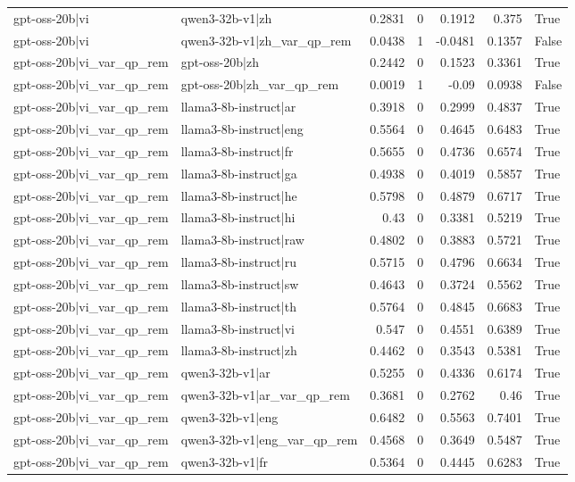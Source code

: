 \begin{table}
\begin{tabular}{l l r r r r l}
gpt-oss-20b|vi & qwen3-32b-v1|zh & 0.2831 & 0 & 0.1912 & 0.375 & True \\
gpt-oss-20b|vi & qwen3-32b-v1|zh_var_qp_rem & 0.0438 & 1 & -0.0481 & 0.1357 & False \\
gpt-oss-20b|vi_var_qp_rem & gpt-oss-20b|zh & 0.2442 & 0 & 0.1523 & 0.3361 & True \\
gpt-oss-20b|vi_var_qp_rem & gpt-oss-20b|zh_var_qp_rem & 0.0019 & 1 & -0.09 & 0.0938 & False \\
gpt-oss-20b|vi_var_qp_rem & llama3-8b-instruct|ar & 0.3918 & 0 & 0.2999 & 0.4837 & True \\
gpt-oss-20b|vi_var_qp_rem & llama3-8b-instruct|eng & 0.5564 & 0 & 0.4645 & 0.6483 & True \\
gpt-oss-20b|vi_var_qp_rem & llama3-8b-instruct|fr & 0.5655 & 0 & 0.4736 & 0.6574 & True \\
gpt-oss-20b|vi_var_qp_rem & llama3-8b-instruct|ga & 0.4938 & 0 & 0.4019 & 0.5857 & True \\
gpt-oss-20b|vi_var_qp_rem & llama3-8b-instruct|he & 0.5798 & 0 & 0.4879 & 0.6717 & True \\
gpt-oss-20b|vi_var_qp_rem & llama3-8b-instruct|hi & 0.43 & 0 & 0.3381 & 0.5219 & True \\
gpt-oss-20b|vi_var_qp_rem & llama3-8b-instruct|raw & 0.4802 & 0 & 0.3883 & 0.5721 & True \\
gpt-oss-20b|vi_var_qp_rem & llama3-8b-instruct|ru & 0.5715 & 0 & 0.4796 & 0.6634 & True \\
gpt-oss-20b|vi_var_qp_rem & llama3-8b-instruct|sw & 0.4643 & 0 & 0.3724 & 0.5562 & True \\
gpt-oss-20b|vi_var_qp_rem & llama3-8b-instruct|th & 0.5764 & 0 & 0.4845 & 0.6683 & True \\
gpt-oss-20b|vi_var_qp_rem & llama3-8b-instruct|vi & 0.547 & 0 & 0.4551 & 0.6389 & True \\
gpt-oss-20b|vi_var_qp_rem & llama3-8b-instruct|zh & 0.4462 & 0 & 0.3543 & 0.5381 & True \\
gpt-oss-20b|vi_var_qp_rem & qwen3-32b-v1|ar & 0.5255 & 0 & 0.4336 & 0.6174 & True \\
gpt-oss-20b|vi_var_qp_rem & qwen3-32b-v1|ar_var_qp_rem & 0.3681 & 0 & 0.2762 & 0.46 & True \\
gpt-oss-20b|vi_var_qp_rem & qwen3-32b-v1|eng & 0.6482 & 0 & 0.5563 & 0.7401 & True \\
gpt-oss-20b|vi_var_qp_rem & qwen3-32b-v1|eng_var_qp_rem & 0.4568 & 0 & 0.3649 & 0.5487 & True \\
gpt-oss-20b|vi_var_qp_rem & qwen3-32b-v1|fr & 0.5364 & 0 & 0.4445 & 0.6283 & True \\

\end{tabular}
\end{table}

